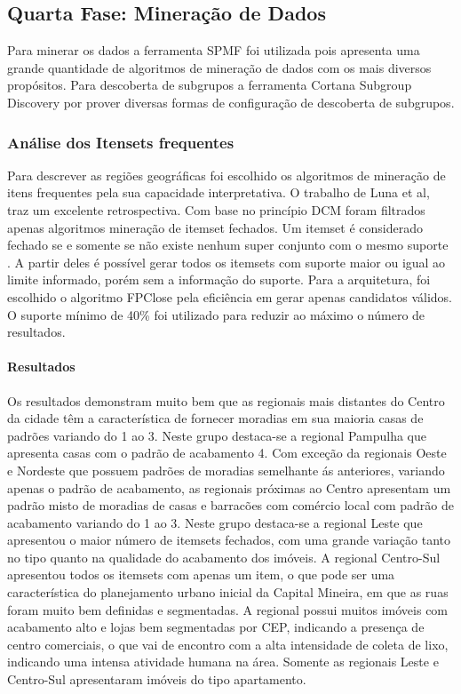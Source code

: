 \documentclass[12pt]{article}
\begin{document}
 \subsection{Quarta Fase: Mineração de Dados}
 Para minerar os dados a ferramenta SPMF \cite{SPMF} foi utilizada pois apresenta uma grande quantidade de algoritmos de mineração de dados com os mais diversos propósitos. Para descoberta de subgrupos a ferramenta Cortana Subgroup Discovery \cite{meeng2011flexible} por prover diversas formas de configuração de descoberta de subgrupos.
 \subsubsection{Análise dos Itensets frequentes}
 Para descrever as regiões geográficas foi escolhido os algoritmos de mineração de itens frequentes pela sua capacidade interpretativa. O trabalho de Luna et al\cite{luna2019frequent}, traz um excelente retrospectiva. Com base no princípio DCM foram filtrados apenas algoritmos mineração de itemset fechados. Um itemset é considerado fechado se e somente se não existe nenhum super conjunto com o mesmo suporte \cite{lucchese2004mining}. A partir deles é possível gerar todos os itemsets com suporte maior ou igual ao limite informado, porém sem a informação do suporte. Para a arquitetura, foi escolhido o algoritmo FPClose \cite{grahne2005fast} pela eficiência em gerar apenas candidatos válidos. O suporte mínimo de 40\% foi utilizado para reduzir ao máximo o número de resultados.
 
\paragraph{Resultados}
Os resultados demonstram muito bem que as regionais mais distantes do Centro da cidade têm a característica de fornecer moradias em sua maioria casas de padrões variando do 1 ao 3. Neste grupo destaca-se a regional Pampulha que apresenta casas com o padrão de acabamento 4. Com exceção da regionais Oeste e Nordeste que possuem padrões de moradias semelhante ás anteriores, variando apenas o padrão de acabamento, as regionais próximas ao Centro apresentam um padrão misto de moradias de casas e barracões com comércio local com padrão de acabamento variando do 1 ao 3.  Neste grupo destaca-se a regional Leste que apresentou o maior número de itemsets fechados, com uma grande variação tanto no tipo quanto na qualidade do acabamento dos imóveis. A regional Centro-Sul apresentou todos os itemsets com apenas um item, o que pode ser uma característica do planejamento urbano inicial da Capital Mineira, em que as ruas foram muito bem definidas e segmentadas. A regional possui muitos imóveis com acabamento alto e lojas bem segmentadas por CEP, indicando a presença de centro comerciais, o que vai de encontro com a alta intensidade de coleta de lixo, indicando uma intensa atividade humana na área. Somente as regionais Leste e Centro-Sul apresentaram imóveis do tipo apartamento.
\end{document}
